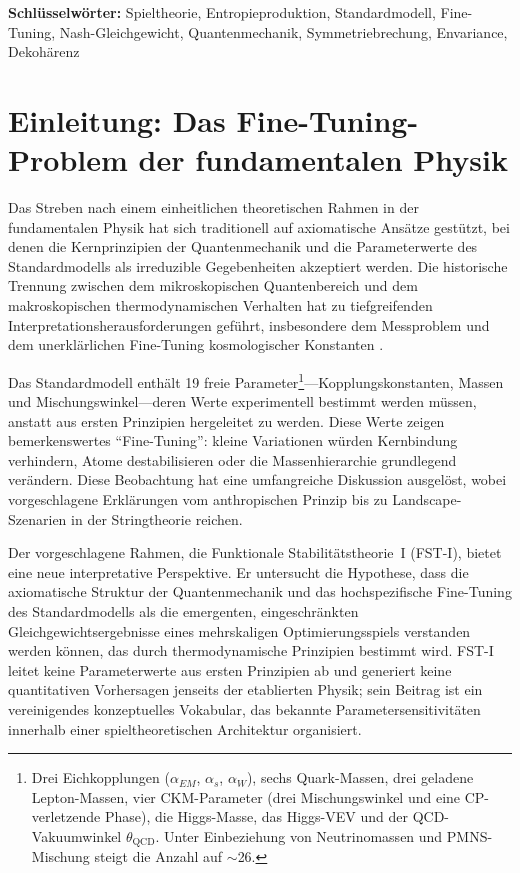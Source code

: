 \documentclass[12pt,a4paper]{article}
\theoremstyle{remark}
\begin{document}
\textbf{Schl\"usselw\"orter:} Spieltheorie, Entropieproduktion, Standardmodell, Fine-Tuning, Nash-Gleichgewicht, Quantenmechanik, Symmetriebrechung, Envariance, Dekoh\"arenz

\section{Einleitung: Das Fine-Tuning-Problem der fundamentalen Physik}
\label{sec:introduction}

Das Streben nach einem einheitlichen theoretischen Rahmen in der fundamentalen Physik hat sich traditionell auf axiomatische Ans\"atze gest\"utzt, bei denen die Kernprinzipien der Quantenmechanik und die Parameterwerte des Standardmodells als irreduzible Gegebenheiten akzeptiert werden. Die historische Trennung zwischen dem mikroskopischen Quantenbereich und dem makroskopischen thermodynamischen Verhalten hat zu tiefgreifenden Interpretationsherausforderungen gef\"uhrt, insbesondere dem Messproblem und dem unerkl\"arlichen Fine-Tuning kosmologischer Konstanten \citep{Adams2019}.

Das Standardmodell enth\"alt 19 freie Parameter\footnote{Drei Eichkopplungen ($\alpha_{EM}$, $\alpha_s$, $\alpha_W$), sechs Quark-Massen, drei geladene Lepton-Massen, vier CKM-Parameter (drei Mischungswinkel und eine CP-verletzende Phase), die Higgs-Masse, das Higgs-VEV und der QCD-Vakuumwinkel $\theta_{\text{QCD}}$. Unter Einbeziehung von Neutrinomassen und PMNS-Mischung steigt die Anzahl auf $\sim$26.}---Kopplungskonstanten, Massen und Mischungswinkel---deren Werte experimentell bestimmt werden m\"ussen, anstatt aus ersten Prinzipien hergeleitet zu werden. Diese Werte zeigen bemerkenswertes ``Fine-Tuning'': kleine Variationen w\"urden Kernbindung verhindern, Atome destabilisieren oder die Massenhierarchie grundlegend ver\"andern. Diese Beobachtung hat eine umfangreiche Diskussion ausgel\"ost, wobei vorgeschlagene Erkl\"arungen vom anthropischen Prinzip \citep{Weinberg1987,Susskind2005} bis zu Landscape-Szenarien in der Stringtheorie \citep{Bousso2000} reichen.

Der vorgeschlagene Rahmen, die Funktionale Stabilit\"atstheorie~I (FST-I), bietet eine neue interpretative Perspektive. Er untersucht die Hypothese, dass die axiomatische Struktur der Quantenmechanik und das hochspezifische Fine-Tuning des Standardmodells als die emergenten, eingeschr\"ankten Gleichgewichtsergebnisse eines mehrskaligen Optimierungsspiels verstanden werden k\"onnen, das durch thermodynamische Prinzipien bestimmt wird. FST-I leitet keine Parameterwerte aus ersten Prinzipien ab und generiert keine quantitativen Vorhersagen jenseits der etablierten Physik; sein Beitrag ist ein vereinigendes konzeptuelles Vokabular, das bekannte Parametersensitivit\"aten innerhalb einer spieltheoretischen Architektur organisiert.
\end{document}
